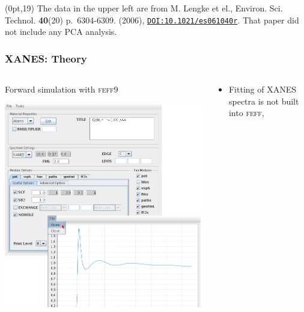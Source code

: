 \documentclass[10pt, xcolor=x11names, compress]{beamer}
\begin{document}
\begin{frame}
\begin{columns}
\begin{column}{0.33\linewidth}
    \end{column}
  \end{columns}
  \begin{textblock*}{0.48\linewidth}(0pt,19\TPVertModule)%
    \tiny%
    The data in the upper left are from M. Lengke et el.,
    Environ. Sci. Technol. \textbf{40}(20) p.~6304-6309. (2006),
    \href{http://dx.doi.org/10.1021/es061040r}
    {\color{Blue4}\texttt{DOI:10.1021/es061040r}}.  That paper did not
      include any PCA analysis.
  \end{textblock*}
\end{frame}

\begin{frame}
  \frametitle{XANES: Theory}
  \begin{columns}
    \begin{column}{0.5\linewidth}
      \begin{center}
        Forward simulation with \textsc{feff}9
      \end{center}
      \includegraphics[width=\linewidth]{images/jfeff.png}
    \end{column}
    \begin{column}{0.5\linewidth}
      \begin{itemize}
      \item Fitting of XANES spectra is not built into \textsc{feff},

\end{itemize}
\end{column}
\end{columns}
\end{frame}
\end{document}
